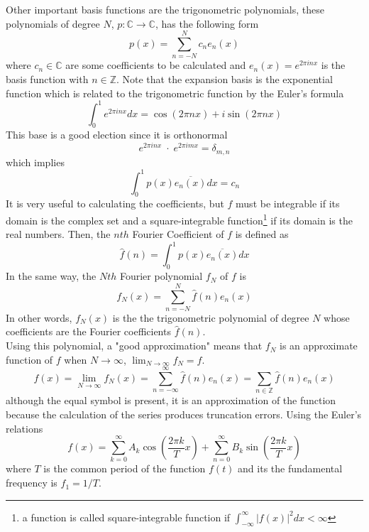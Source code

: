 Other important basis functions are the trigonometric polynomials, these polynomials of degree $N$, $p:\mathbb{C}\to\mathbb{C}$, has the following form
\begin{equation*}
    p(x) = \sum_{n=-N}^N c_n e_n(x)
\end{equation*}
where $c_n \in \mathbb{C}$ are some coefficients to be calculated and $e_n(x)=e^{2\pi i n x}$ is the basis function with $n\in\mathbb{Z}$. Note that the expansion basis is the exponential function which is related to the trigonometric function by the Euler's formula
\begin{equation*}
    \int_0^1 e^{2\pi i n x} dx = \cos (2\pi  n x) + i \sin (2\pi n x)
\end{equation*}
This base is a good election since it is orthonormal
\begin{equation*}
    e^{2\pi i n x} \; \cdot \; e^{2\pi i m x} = \delta_{m,n}
\end{equation*}
which implies
\begin{equation*}
    \int_0^1 p(x) \overline{e_n(x)} dx = c_n
\end{equation*}
It is very useful to calculating the coefficients, but $f$ must be integrable if its domain is the complex set and a square-integrable function\footnote{a function is called square-integrable function if $\int_{-\infty}^\infty |f(x)|^2 dx < \infty$} if its domain is the real numbers. Then, the $nth$ Fourier Coefficient of $f$ is defined as
\begin{equation*}
    \hat{f}(n) = \int_0^1 p(x) \overline{e_n(x)} dx 
\end{equation*}
In the same way, the $Nth$ Fourier polynomial $f_N$ of $f$ is
\begin{equation*}
    f_N(x) =  \sum_{n=-N}^N \hat{f}(n) e_n(x) 
\end{equation*}
In other words, $f_N(x)$ is the the trigonometric polynomial of degree $N$ whose coefficients are the Fourier coefficients $\hat{f}(n)$.\\

Using this polynomial, a "good approximation" means that $f_N$ is an approximate function of $f$ when $N\to \infty$, $\lim_{N\to \infty} f_N = f$.
\begin{equation}\label{eq:Fourier_serie}
    f(x) = \lim_{N\to \infty} f_N(x) = \sum_{n=-\infty}^\infty \hat{f}(n) e_n(x) = \sum_{n\in \mathbb{Z}} \hat{f}(n) e_n(x) 
\end{equation}
although the equal symbol is present, it is an approximation of the function because the calculation of the series produces truncation errors. Using the Euler's relations
\begin{equation*}
    f(x) = \sum_{k=0}^\infty A_k \cos \left( \frac{2\pi k}{T}x \right) + \sum_{n=0}^\infty  B_k \sin \left(\frac{2\pi k}{T}x \right)
\end{equation*}
where $T$ is the common period of the function $f(t)$ and its the fundamental frequency is $f_1=1/T$. \cite{fourier_signal, fourier_math}

